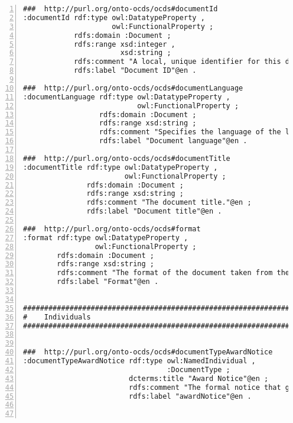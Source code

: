 \begin{minipage}{\textwidth}
\begin{lstlisting}[captionpos=b, caption={Extracto de código de la ontología OCDSPY}, label={lst:ocdspyAnexo},  numbers=left,  numberstyle=\tiny\color{mygray},frame=single]
###  http://purl.org/onto-ocds/ocds#documentId
:documentId rdf:type owl:DatatypeProperty ,
                     owl:FunctionalProperty ;
            rdfs:domain :Document ;
            rdfs:range xsd:integer ,
                       xsd:string ;
            rdfs:comment "A local, unique identifier for this document. This field is used to keep track of multiple revisions of a document through the compilation from release to record mechanism."@en ;
            rdfs:label "Document ID"@en .

###  http://purl.org/onto-ocds/ocds#documentLanguage
:documentLanguage rdf:type owl:DatatypeProperty ,
                           owl:FunctionalProperty ;
                  rdfs:domain :Document ;
                  rdfs:range xsd:string ;
                  rdfs:comment "Specifies the language of the linked document using either two-digit [ISO 639-1](https://en.wikipedia.org/wiki/List_of_ISO_639-1_codes), or extended [BCP47 language tags](http://www.w3.org/International/articles/language-tags/). The use of two-letter codes from [ISO 639-1](https://en.wikipedia.org/wiki/List_of_ISO_639-1_codes) is strongly recommended unless there is a clear user need for distinguishing the language subtype."@en ;
                  rdfs:label "Document language"@en .

###  http://purl.org/onto-ocds/ocds#documentTitle
:documentTitle rdf:type owl:DatatypeProperty ,
                        owl:FunctionalProperty ;
               rdfs:domain :Document ;
               rdfs:range xsd:string ;
               rdfs:comment "The document title."@en ;
               rdfs:label "Document title"@en .

###  http://purl.org/onto-ocds/ocds#format
:format rdf:type owl:DatatypeProperty ,
                 owl:FunctionalProperty ;
        rdfs:domain :Document ;
        rdfs:range xsd:string ;
        rdfs:comment "The format of the document taken from the [IANA Media Types code list](http://www.iana.org/assignments/media-types/), with the addition of one extra value for 'offline/print', used when this document entry is being used to describe the offline publication of a document. Use values from the template column. Links to web pages should be tagged 'text/html'."@en ;
        rdfs:label "Format"@en .


#################################################################
#    Individuals
#################################################################


###  http://purl.org/onto-ocds/ocds#documentTypeAwardNotice
:documentTypeAwardNotice rdf:type owl:NamedIndividual ,
                                  :DocumentType ;
                         dcterms:title "Award Notice"@en ;
                         rdfs:comment "The formal notice that gives details of the contract award. This may be a link to a downloadable document, to a web page, or to an official gazette in which the notice is contained."@en ;
                         rdfs:label "awardNotice"@en .



\end{lstlisting}
\end{minipage}
